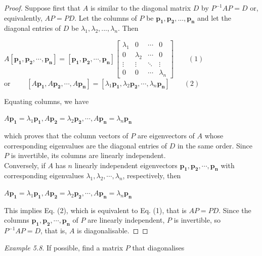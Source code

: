 \documentclass[
  letterpaper,
  DIV=11,
  numbers=noendperiod]{scrartcl}
\theoremstyle{remark}
\begin{document}
\begin{proof}
Suppose first that \(A\) is similar to the diagonal matrix \(D\) by
\(P^{-1}AP = D\) or, equivalently, \(AP = PD\). Let the columns of \(P\)
be \(\mathbf{p_{1}}, \mathbf{p_{2}}, ..., \mathbf{p_{n}}\) and let the
diagonal entries of \(D\) be
\(\lambda _{1}, \lambda _{2}, ..., \lambda _{n}\). Then

\(A\left[\mathbf{p_{1}}, \mathbf{p_{2}}, \cdots, \mathbf{p_{n}}\right] = \left[\mathbf{p_{1}}, \mathbf{p_{2}}, \cdots, \mathbf{p_{n}}\right] \left[\begin{array}{cccc} \lambda _{1} & 0 & \cdots & 0 \\ 0 & \lambda _{2} & \cdots & 0 \\ \vdots & \vdots & \ddots & \vdots \\ 0 & 0 & \cdots & \lambda _{n} \end{array}\right] \qquad (1)\)\\
or
\(\qquad \left[A\mathbf{p_{1}}, A\mathbf{p_{2}}, \cdots, A\mathbf{p_{n}}\right] = \left[\lambda _{1}\mathbf{p_{1}}, \lambda _{2}\mathbf{p_{2}}, \cdots, \lambda _{n}\mathbf{p_{n}}\right] \qquad (2)\)

Equating columns, we have

\(A\mathbf{p_{1}} = \lambda _{1}\mathbf{p_{1}}, A\mathbf{p_{2}} = \lambda _{2}\mathbf{p_{2}}, \cdots , A\mathbf{p_{n}} = \lambda _{n}\mathbf{p_{n}}\)

which proves that the column vectors of \(P\) are eigenvectors of \(A\)
whose corresponding eigenvalues are the diagonal entries of \(D\) in the
same order. Since \(P\) is invertible, its columns are linearly
independent.\\
Conversely, if \(A\) has \(n\) linearly independent eigenvectors
\(\mathbf{p_{1}}, \mathbf{p_{2}}, \cdots , \mathbf{p_{n}}\) with
corresponding eigenvalues
\(\lambda _{1}, \lambda _{2}, \cdots , \lambda _{n}\), respectively,
then

\(A\mathbf{p_{1}} = \lambda _{1}\mathbf{p_{1}}, A\mathbf{p_{2}} = \lambda _{2}\mathbf{p_{2}}, \cdots , A\mathbf{p_{n}} = \lambda _{n}\mathbf{p_{n}}\)

This implies Eq. (2), which is equivalent to Eq. (1), that is
\(AP = PD\). Since the columns
\(\mathbf{p_{1}}, \mathbf{p_{2}}, \cdots , \mathbf{p_{n}}\) of \(P\) are
linearly independent, \(P\) is invertible, so \(P^{-1}AP = D\), that is,
\(A\) is diagonalisable.~◻
\end{proof}

\emph{Example 5.8}. If possible, find a matrix \(P\) that diagonalises
\end{document}
